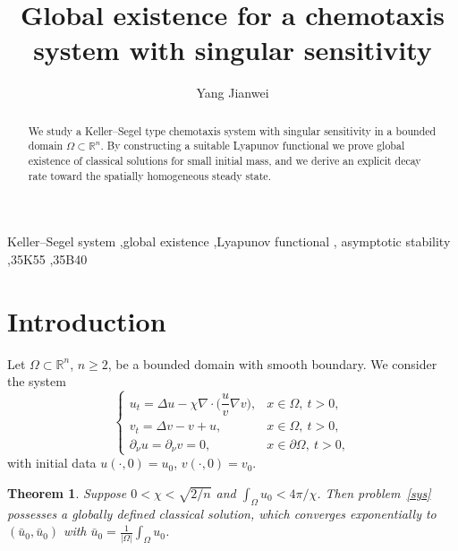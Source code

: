 \documentclass[preprint,12pt]{elsarticle}
\newtheorem{theorem}{Theorem}[section]
\theoremstyle{definition}
\newcommand{\R}{\mathbb{R}}
\newcommand{\Om}{\Omega}
\begin{document}
\begin{frontmatter}

\title{Global existence for a chemotaxis system with singular sensitivity}

\author[1]{Yang Jianwei}
\address[1]{School of Mathematics and Statistics,
North China University of Water Resources and Electric Power,
Zhengzhou 450046, P.R. China}

\begin{abstract}
We study a Keller--Segel type chemotaxis system with singular sensitivity
in a bounded domain $\Om\subset\R^n$. By constructing a suitable
Lyapunov functional we prove global existence of classical solutions
for small initial mass, and we derive an explicit decay rate toward
the spatially homogeneous steady state.
\end{abstract}

\begin{keyword}
Keller--Segel system \sep global existence \sep Lyapunov functional \sep
asymptotic stability \sep 35K55 \sep 35B40
\end{keyword}

\end{frontmatter}

\section{Introduction}\label{s:intro}

Let $\Om\subset\R^n$, $n\ge2$, be a bounded domain with smooth boundary.
We consider the system
\begin{equation}\label{sys}
  \begin{cases}
    u_t = \Delta u - \chi\nabla\cdot\bigl(\dfrac{u}{v}\nabla v\bigr), & x\in\Om,\ t>0,\\[6pt]
    v_t = \Delta v - v + u, & x\in\Om,\ t>0,\\[4pt]
    \partial_\nu u = \partial_\nu v = 0, & x\in\partial\Om,\ t>0,
  \end{cases}
\end{equation}
with initial data $u(\cdot,0)=u_0$, $v(\cdot,0)=v_0$.

\begin{theorem}\label{thm:main}
Suppose $0<\chi<\sqrt{2/n}$ and $\int_\Om u_0<4\pi/\chi$. Then
problem~\eqref{sys} possesses a globally defined classical solution,
which converges exponentially to $(\bar u_0,\bar u_0)$ with
$\bar u_0=\frac{1}{|\Om|}\int_\Om u_0$.
\end{theorem}
\end{document}
